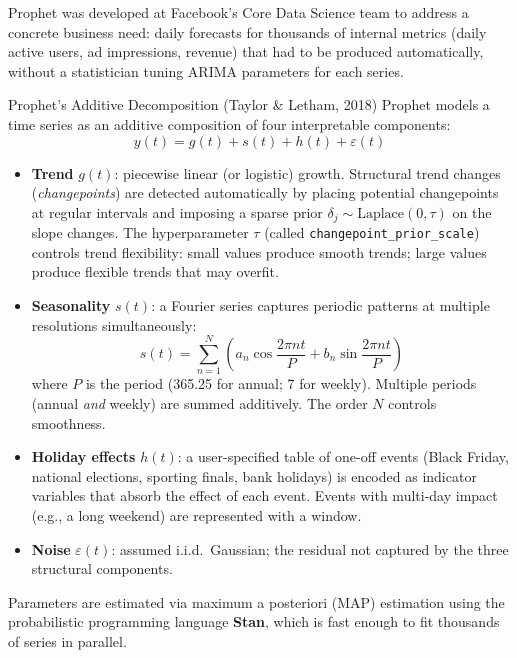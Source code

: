 Prophet \autocite{Prophet2018} was developed at Facebook's Core Data
Science team to address a concrete business need: daily forecasts for
thousands of internal metrics (daily active users, ad impressions,
revenue) that had to be produced automatically, without a statistician
tuning ARIMA parameters for each series.

\begin{defbox}{Prophet's Additive Decomposition (Taylor \& Letham, 2018)}
Prophet models a time series as an additive composition of four
interpretable components:
\[
  y(t) = g(t) + s(t) + h(t) + \varepsilon(t)
\]
\begin{itemize}
  \item \textbf{Trend} $g(t)$: piecewise linear (or logistic) growth.
        Structural trend changes (\emph{changepoints}) are detected
        automatically by placing potential changepoints at regular
        intervals and imposing a sparse prior
        $\delta_j \sim \mathrm{Laplace}(0, \tau)$ on the slope changes.
        The hyperparameter $\tau$ (called \texttt{changepoint\_prior\_scale})
        controls trend flexibility: small values produce smooth trends;
        large values produce flexible trends that may overfit.
  \item \textbf{Seasonality} $s(t)$: a Fourier series captures periodic
        patterns at multiple resolutions simultaneously:
        \[
          s(t) = \sum_{n=1}^{N}
          \left(a_n \cos\frac{2\pi n t}{P} +
                b_n \sin\frac{2\pi n t}{P}\right)
        \]
        where $P$ is the period (365.25 for annual; 7 for weekly).
        Multiple periods (annual \emph{and} weekly) are summed additively.
        The order $N$ controls smoothness.
  \item \textbf{Holiday effects} $h(t)$: a user-specified table of
        one-off events (Black Friday, national elections, sporting finals,
        bank holidays) is encoded as indicator variables that absorb the
        effect of each event. Events with multi-day impact (e.g., a
        long weekend) are represented with a window.
  \item \textbf{Noise} $\varepsilon(t)$: assumed i.i.d.\ Gaussian;
        the residual not captured by the three structural components.
\end{itemize}
Parameters are estimated via maximum a posteriori (MAP) estimation
using the probabilistic programming language \textbf{Stan}, which is
fast enough to fit thousands of series in parallel.
\end{defbox}

